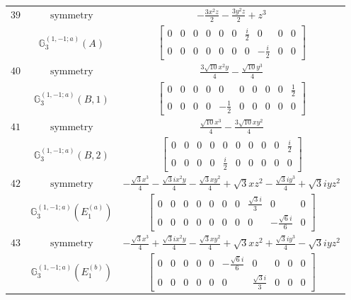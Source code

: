 \documentclass[fleqn,8pt,landscape]{jsarticle}
\begin{document}
\begin{longtable}{ccc}
$ 39 $ & $ \text{symmetry} $ & $ - \frac{3 x^{2} z}{2} - \frac{3 y^{2} z}{2} + z^{3} $ \\
$  $ & $ \mathbb{G}_{3}^{(1,-1;a)}(A) $ & $ \begin{bmatrix} 0 & 0 & 0 & 0 & 0 & 0 & \frac{i}{2} & 0 & 0 & 0 \\ 0 & 0 & 0 & 0 & 0 & 0 & 0 & - \frac{i}{2} & 0 & 0 \end{bmatrix} $ \\ \hline
$ 40 $ & $ \text{symmetry} $ & $ \frac{3 \sqrt{10} x^{2} y}{4} - \frac{\sqrt{10} y^{3}}{4} $ \\
$  $ & $ \mathbb{G}_{3}^{(1,-1;a)}(B,1) $ & $ \begin{bmatrix} 0 & 0 & 0 & 0 & 0 & 0 & 0 & 0 & 0 & \frac{1}{2} \\ 0 & 0 & 0 & 0 & - \frac{1}{2} & 0 & 0 & 0 & 0 & 0 \end{bmatrix} $ \\ \hline
$ 41 $ & $ \text{symmetry} $ & $ \frac{\sqrt{10} x^{3}}{4} - \frac{3 \sqrt{10} x y^{2}}{4} $ \\
$  $ & $ \mathbb{G}_{3}^{(1,-1;a)}(B,2) $ & $ \begin{bmatrix} 0 & 0 & 0 & 0 & 0 & 0 & 0 & 0 & 0 & \frac{i}{2} \\ 0 & 0 & 0 & 0 & \frac{i}{2} & 0 & 0 & 0 & 0 & 0 \end{bmatrix} $ \\ \hline
$ 42 $ & $ \text{symmetry} $ & $ - \frac{\sqrt{3} x^{3}}{4} - \frac{\sqrt{3} i x^{2} y}{4} - \frac{\sqrt{3} x y^{2}}{4} + \sqrt{3} x z^{2} - \frac{\sqrt{3} i y^{3}}{4} + \sqrt{3} i y z^{2} $ \\
$  $ & $ \mathbb{G}_{3}^{(1,-1;a)}(E_{1}^{(a)}) $ & $ \begin{bmatrix} 0 & 0 & 0 & 0 & 0 & 0 & 0 & \frac{\sqrt{3} i}{3} & 0 & 0 \\ 0 & 0 & 0 & 0 & 0 & 0 & 0 & 0 & - \frac{\sqrt{6} i}{6} & 0 \end{bmatrix} $ \\ \hline
$ 43 $ & $ \text{symmetry} $ & $ - \frac{\sqrt{3} x^{3}}{4} + \frac{\sqrt{3} i x^{2} y}{4} - \frac{\sqrt{3} x y^{2}}{4} + \sqrt{3} x z^{2} + \frac{\sqrt{3} i y^{3}}{4} - \sqrt{3} i y z^{2} $ \\
$  $ & $ \mathbb{G}_{3}^{(1,-1;a)}(E_{1}^{(b)}) $ & $ \begin{bmatrix} 0 & 0 & 0 & 0 & 0 & - \frac{\sqrt{6} i}{6} & 0 & 0 & 0 & 0 \\ 0 & 0 & 0 & 0 & 0 & 0 & \frac{\sqrt{3} i}{3} & 0 & 0 & 0 \end{bmatrix} $ \\ \hline

\end{longtable}
\end{document}
